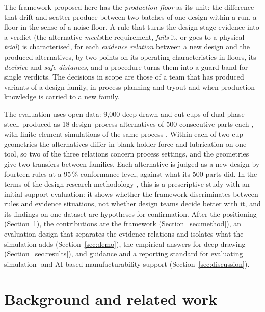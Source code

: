 \documentclass[pdflatex,sn-basic,lineno]{sn-jnl}
\providecommand{\DIFadd}[1]{{\protect\color{blue}\uwave{#1}}} %
\providecommand{\DIFdel}[1]{{\protect\color{red}\sout{#1}}}                      %
\providecommand{\DIFaddbegin}{} %
\providecommand{\DIFaddend}{} %
\providecommand{\DIFdelbegin}{} %
\providecommand{\DIFdelend}{} %
\newcommand{\DIFscaledelfig}{0.5}
\newlength{\DIFdelgraphicswidth} %
\newlength{\DIFdelgraphicsheight} %
\newcommand{\DIFaddincludegraphics}[2][]{{\color{blue}\fbox{\DIFOincludegraphics[#1]{#2}}}} %
\newcommand{\DIFdelincludegraphics}[2][]{%
\sbox{\DIFdelgraphicsbox}{\DIFOincludegraphics[#1]{#2}}%
\settoboxwidth{\DIFdelgraphicswidth}{\DIFdelgraphicsbox} %
\settoboxtotalheight{\DIFdelgraphicsheight}{\DIFdelgraphicsbox} %
\scalebox{\DIFscaledelfig}{%
\parbox[b]{\DIFdelgraphicswidth}{\usebox{\DIFdelgraphicsbox}\\[-\baselineskip] \rule{\DIFdelgraphicswidth}{0em}}\llap{\resizebox{\DIFdelgraphicswidth}{\DIFdelgraphicsheight}{%
\setlength{\unitlength}{\DIFdelgraphicswidth}%
\begin{picture}(1,1)%
\thicklines\linethickness{2pt} %
{\color[rgb]{1,0,0}\put(0,0){\framebox(1,1){}}}%
{\color[rgb]{1,0,0}\put(0,0){\line( 1,1){1}}}%
{\color[rgb]{1,0,0}\put(0,1){\line(1,-1){1}}}%
\end{picture}%
}\hspace*{3pt}}} %
} %
\DeclareRobustCommand{\DIFaddbegin}{\DIFOaddbegin \let\includegraphics\DIFaddincludegraphics} %
\DeclareRobustCommand{\DIFaddend}{\DIFOaddend \let\includegraphics\DIFOincludegraphics} %
\DeclareRobustCommand{\DIFdelbegin}{\DIFOdelbegin \let\includegraphics\DIFdelincludegraphics} %
\DeclareRobustCommand{\DIFdelend}{\DIFOaddend \let\includegraphics\DIFOincludegraphics} %
\begin{document}
The framework proposed here has the \emph{production floor} as its unit: the difference that drift and scatter \DIFaddbegin \DIFadd{of production and measurement }\DIFaddend produce between two batches of one design within a run, a floor in the sense of a noise floor. A rule that turns the design-stage evidence into a verdict (\DIFdelbegin \DIFdel{the alternative }\DIFdelend \emph{meets}\DIFdelbegin \DIFdel{the requirement}\DIFdelend , \emph{fails} \DIFdelbegin \DIFdel{it, or goes to }\DIFdelend \DIFaddbegin \DIFadd{or }\DIFaddend a physical \emph{trial}) is characterised, for each \emph{evidence relation} between a new design and the produced alternatives, by two points on its operating characteristics in floors, its \emph{decisive} and \emph{safe distances}, and a procedure turns them into a guard band for single verdicts. The decisions in scope are those of a team that has produced variants of a design family, in process planning and tryout and when production knowledge is carried to a new family.

The evaluation uses open data: 9,000 deep-drawn and cut cups of dual-phase steel, produced as 18 design--process alternatives of 500 consecutive parts each \citep{baum2026rddac}, with finite-element simulations of the same process \citep{baum2025ddacs}. Within each of two cup geometries the alternatives differ in blank-holder force and lubrication on one tool, so two of the three relations concern process settings, and the geometries give two transfers between families. Each alternative is judged as a new design by fourteen rules at a 95\,\% conformance level, against what its 500 parts did. In the terms of the design research methodology \citep{blessing2009drm}, this is a prescriptive study with an initial support evaluation: it shows whether the framework discriminates between rules and evidence situations, not whether design teams decide better with it, and its findings on one dataset are hypotheses for confirmation. After the positioning (Section~\ref{sec:background}), the contributions are the framework (Section~\ref{sec:method}), an evaluation design that separates the evidence relations and isolates what the simulation adds (Section~\ref{sec:demo}), the empirical answers for deep drawing (Section~\ref{sec:results}), and guidance and a reporting standard for evaluating simulation- and AI-based manufacturability support (Section~\ref{sec:discussion}).

\section{Background and related work}\label{sec:background}
\end{document}
